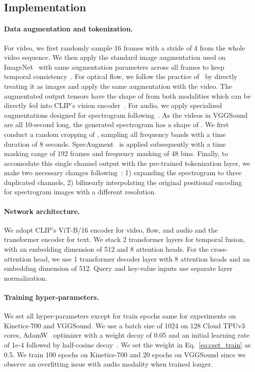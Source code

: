 \documentclass{article}
\begin{document}
\subsection{Implementation}
\label{subsec:detail}
\paragraph{Data augmentation and tokenization.} For video, we first randomly sample 16 frames with a stride of 4 from the whole video sequence. We then apply the standard image augmentation used on ImageNet~\cite{he2016deep, he2019bag} with same augmentation parameters across all frames to keep temporal consistency~\cite{qian2021spatiotemporal}. 
For optical flow, we follow the practice of~\cite{xie2018rethinking, han2020memory, han2020self} by directly treating it as images and apply the same augmentation with the video. The augmentated output tensors have the shape of  from both modalities which can be directly fed into CLIP's vision encoder~\cite{radford2021learning}. 
For audio, we apply specialized augmentations designed for spectrogram following~\cite{gong21ast, nagrani2021attention}. As the videos in VGGSound are all 10-second long, the generated spectrogram has a shape of . We first conduct a random cropping of , sampling all frequency bands with a time duration of 8 seconds. 
SpecAugment~\cite{park2019specaugment} is applied subsequently with a time masking range of 192 frames and frequency masking of 48 bins. 
Finally, to accomodate this single channel output with the pre-trained tokenization layer, we make two necessary changes following~\cite{gong21ast}: 1) expanding the spectrogram to three duplicated channels, 2) bilinearly interpolating the original positional encoding for spectrogram images with a different resolution.  

\paragraph{Network architecture.} We adopt CLIP's ViT-B/16 encoder for video, flow, and audio and the transformer encoder for text. We stack 2 transformer layers for temporal fusion, with an embedding dimension of 512 and 8 attention heads. For the cross-attention head, we use 1 transformer decoder layer with 8 attention heads and an embedding dimension of 512. Query and key-value inputs use separate layer normalization. 

\paragraph{Training hyper-parameters.} We set all hyper-parameters except for train epochs same for experiments on Kinetics-700 and VGGSound. We use a batch size of 1024 on 128 Cloud TPUv3 cores, AdamW~\cite{loshchilov2017decoupled} optimizer with a weight decay of 0.05 and an initial learning rate of 1e-4 followed by half-cosine decay~\cite{he2019bag}. We set the weight  in Eq.~\ref{eq:cset_train} as 0.5. We train 100 epochs on Kinetics-700 and 20 epochs on VGGSound since we observe an overfitting issue with audio modality when trained longer. 
\end{document}
